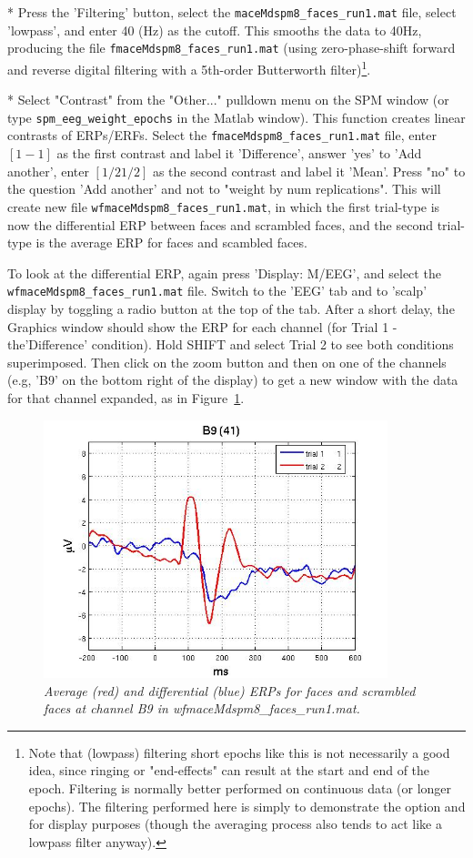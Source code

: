 * Press the 'Filtering' button, select the \verb!maceMdspm8_faces_run1.mat! file, select 'lowpass', and enter 40 (Hz) as the cutoff. This smooths the data to 40Hz, producing the file \verb!fmaceMdspm8_faces_run1.mat! (using zero-phase-shift forward and reverse  digital filtering with a 5th-order Butterworth filter)\footnote{Note that (lowpass) filtering short epochs like this is not necessarily a good idea, since ringing or "end-effects" can result at the start and end of the epoch. Filtering is normally better performed on continuous data (or longer epochs). The filtering performed here is simply to demonstrate the option and for display purposes (though the averaging process also tends to act like a lowpass filter anyway).}.

* Select "Contrast" from the "Other..." pulldown menu on the SPM window (or type \verb!spm_eeg_weight_epochs! in the Matlab window). This function creates linear contrasts of ERPs/ERFs. Select the \verb!fmaceMdspm8_faces_run1.mat! file,  enter $[1 -1]$ as the first contrast and label it 'Difference', answer 'yes' to 'Add another',  enter $[1/2 1/2]$ as the second contrast and label it 'Mean'. Press "no" to the question 'Add another' and not to "weight by num replications". This will create new file \verb!wfmaceMdspm8_faces_run1.mat!, in which the first trial-type is now the differential ERP between faces and scrambled faces, and the second trial-type is the average ERP for faces and scambled faces.

To look at the differential ERP, again press 'Display: M/EEG', and select the \verb!wfmaceMdspm8_faces_run1.mat! file. Switch to the 'EEG' tab and to 'scalp' display by toggling a radio button at the top of the tab. After a short delay, the Graphics window should show the ERP for each channel (for Trial 1 - the'Difference' condition). Hold SHIFT and select Trial 2 to see both conditions superimposed. Then click on the zoom button and then on one of the channels (e.g, 'B9' on the bottom right of the display) to get a new window with the data for that channel expanded, as in Figure~\ref{fig_32_4}.

\begin{figure}
\begin{center}
\includegraphics[width=100mm]{multimodal/figures/figure_32_4}
\caption{\em  Average (red) and differential (blue) ERPs for faces and scrambled faces at channel B9 in wfmaceMdspm8_faces_run1.mat. \label{fig_32_4}}
\end{center}
\end{figure}

